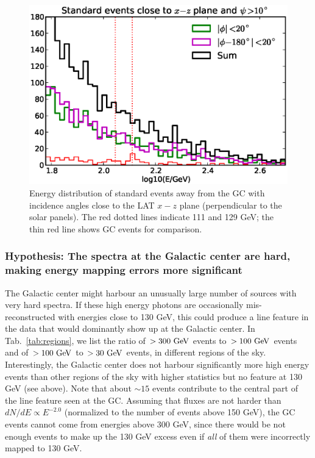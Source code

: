 \documentclass[aps,twocolumn,prd,superscriptaddress,showpacs,nofootinbib,fixfloat]{revtex4}
\newcommand{\GeV}{{\rm ~GeV}}
\begin{document}
\begin{figure}
  \centering
  \includegraphics[width=1.0\linewidth]{plots/phi_energy.eps}
  \caption{Energy distribution of standard events away from the GC with
  incidence angles close to the LAT $x-z$ plane (perpendicular to the solar
  panels). The red dotted lines indicate 111 and 129 GeV; the thin red line
  shows GC events for comparison.}
  \label{fig:spectrum_phi}
\end{figure}

\subsubsection{Hypothesis: The spectra at the Galactic center are hard, making
energy mapping errors more significant}

The Galactic center might harbour an unusually large number of sources with
very hard spectra. If these high energy photons are occasionally
mis-reconstructed with energies close to 130 GeV, this could produce a line
feature in the data that would dominantly show up at the Galactic center.  In
Tab.~\ref{tab:regions}, we list the ratio of $>300\GeV$ events to $>100\GeV$
events and of $>100\GeV$ to $>30\GeV$ events, in different regions of the sky.
Interestingly, the Galactic center does not harbour significantly more high
energy events than other regions of the sky with higher statistics but no
feature at 130 GeV (see above). Note that about $\sim15$ events contribute to
the central part of the line feature seen at the GC. Assuming that fluxes are
not harder than $dN/dE \propto E^{-2.0}$ (normalized to the number of events
above 150 GeV), the GC events cannot come from energies above 300 GeV, since
there would be not enough events to make up the 130 GeV excess even if
\emph{all} of them were incorrectly mapped to 130 GeV. 
\end{document}
